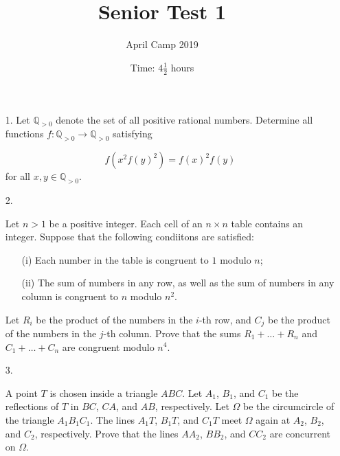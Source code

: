 \documentclass[a4paper, 12pt]{article}
\title{Senior Test 1}
\author{April Camp 2019}
\date{Time: $4 \frac{1}{2}$ hours}
\begin{document}
 \maketitle

\begin{enumerate}

\item[1.]  Let $\mathbb{Q}_{> 0}$ denote the set of all positive rational numbers. Determine all functions $f: \mathbb{Q}_{> 0} \to \mathbb{Q}_{> 0}$ satisfying

$$ f \left( x^2 f(y)^2\right) = f(x)^2 f(y) $$
for all $x, y \in \mathbb{Q}_{> 0}$. \\

\vspace{20pt}

\item[2.]    

Let $n > 1$ be a positive integer. Each cell of an $n \times n$ table contains an integer. Suppose that the following condiitons are satisfied:

\begin{enumerate}
    \item[(i)] Each number in the table is congruent to $1$ modulo $n$;
    
    \item[(ii)] The sum of numbers in any row, as well as the sum of numbers in any column is congruent to $n$ modulo $n^2$.
    
\end{enumerate}

Let $R_i$ be the product of the numbers in the $i$-th row, and $C_j$ be the product of the numbers in the $j$-th column. Prove that the sums $R_1 + \dots + R_n$ and $C_1 + \dots + C_n$ are congruent modulo $n^4$.


\vspace{20pt}

\item[3.]   

A point $T$ is chosen inside a triangle $ABC$. Let $A_1$, $B_1$, and $C_1$ be the reflections of $T$ in $BC$, $CA$, and $AB$, respectively. Let $\Omega$ be the circumcircle of the triangle $A_1 B_1 C_1$. The lines $A_1 T$, $B_1 T$, and $C_1 T$ meet $\Omega$ again at $A_2$, $B_2$, and $C_2$, respectively. Prove that the lines $AA_2$, $BB_2$, and $CC_2$ are concurrent on $\Omega$.

\end{enumerate}
\end{document}
